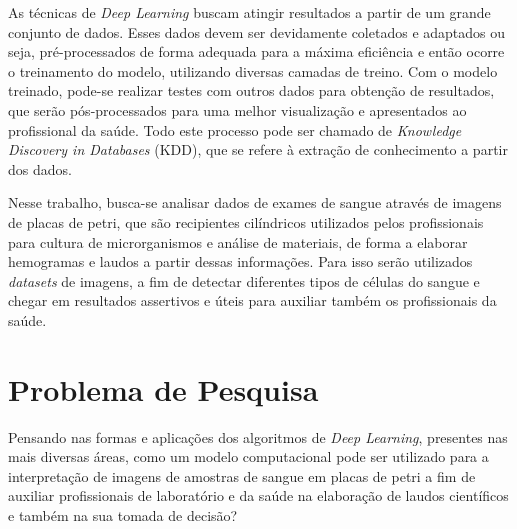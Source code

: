 As técnicas de \emph{Deep Learning} buscam atingir resultados a partir de um grande conjunto de dados. Esses dados devem ser devidamente coletados e adaptados ou seja, pré-processados de forma adequada para a máxima eficiência e então ocorre o treinamento do modelo, utilizando diversas camadas de treino. Com o modelo treinado, pode-se realizar testes com outros dados para obtenção de resultados, que serão pós-processados para uma melhor visualização e apresentados ao profissional da saúde. Todo este processo pode ser chamado de \emph{Knowledge Discovery in Databases} (KDD), que se refere à extração de conhecimento a partir dos dados.

Nesse trabalho, busca-se analisar dados de exames de sangue através de imagens de placas de petri, que são recipientes cilíndricos utilizados pelos profissionais para cultura de microrganismos e análise de materiais, de forma a elaborar hemogramas e laudos a partir dessas informações. Para isso serão utilizados \emph{datasets} de imagens, a fim de detectar diferentes tipos de células do sangue e chegar em resultados assertivos e úteis para auxiliar também os profissionais da saúde.


\section{Problema de Pesquisa}
\label{sec:problema}

Pensando nas formas e aplicações dos algoritmos de \emph{Deep Learning}, presentes nas mais diversas áreas, como um modelo computacional pode ser utilizado para a interpretação de imagens de amostras de sangue em placas de petri a fim de auxiliar profissionais de laboratório e da saúde na elaboração de laudos científicos e também na sua tomada de decisão?


